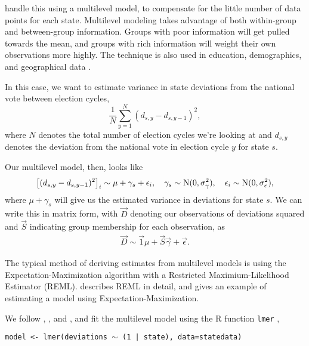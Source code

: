 \documentclass[thesis.tex]{subfiles}
\begin{document}
\cite{Lock:2010aa} handle this using a multilevel model, to compensate for the little number of data points for each state. Multilevel modeling takes advantage of both within-group and between-group information. Groups with poor information will get pulled towards the mean, and groups with rich information will weight their own observations more highly. The technique is also used in education, demographics, and geographical data \citep{Ghitza:2013aa,Gelman:2006aa,Aitkin:1981aa}.

In this case, we want to estimate variance in state deviations from the national vote between election cycles, \[
  \frac{1}{N}\sum_{y=1}^N (d_{s, y} - d_{s, y - 1})^2,
\] where \(N\) denotes the total number of election cycles we're looking at and \(d_{s, y}\) denotes the deviation from the national vote in election cycle \(y\) for state \(s\).

Our multilevel model, then, looks like \begin{equation}
	\left[(d_{s, y} - d_{s, y - 1})^2\right]_i \sim \mu + \gamma_s + \epsilon_i, \quad
	\gamma_s \sim \operatorname{N}(0, \sigma_\gamma^2), \quad
	\epsilon_i \sim \operatorname{N}(0, \sigma_\epsilon^2),
\end{equation} where \(\mu + \gamma_s\) will give us the estimated variance in deviations for state \(s\). We can write this in matrix form, with \(\vec{D}\) denoting our observations of deviations squared and \(\vec{S}\) indicating group membership for each observation, as \begin{align}
	\vec{D} \sim \vec{1}\mu + \vec{S}\vec{\gamma} + \vec{\epsilon}.
\end{align}

The typical method of deriving estimates from multilevel models is using the Expectation-Maximization algorithm with a Restricted Maximium-Likelihood Estimator (REML). \cite{Harville:1977aa} describes REML in detail, and \cite{Aitkin:1981aa} gives an example of estimating a model using Expectation-Maximization.

We follow \cite{Lock:2010aa}, \cite{Gelman:2006aa}, and \cite{Gelman:2007aa}, and fit the multilevel model using the R function \texttt{lmer} \citep{lme4},
\begin{center}
	\texttt{model <- lmer(deviations \(\sim\) (1 | state), data=statedata)}
\end{center}

\end{document}
